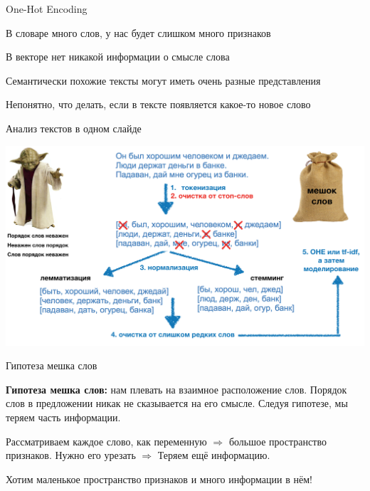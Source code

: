 \documentclass[notes,12pt, aspectratio=169]{beamer}
\newenvironment{wideitemize}{\itemize\addtolength{\itemsep}{10pt}}{\enditemize}
\begin{document}
\begin{frame}{One-Hot Encoding}
\begin{wideitemize} 
	\item  В словаре много слов, у нас будет слишком много признаков
	\item  В векторе нет никакой информации о смысле слова
	\item  Семантически похожие тексты могут иметь очень разные представления
	\item  Непонятно, что делать, если в тексте появляется какое-то новое слово
\end{wideitemize}
\end{frame} 


\begin{frame}{Анализ текстов в одном слайде}
\begin{center}
	\includegraphics[width=.95\linewidth]{classic_text.png}
\end{center}
\end{frame} 


\begin{frame}{Гипотеза мешка слов}
\begin{wideitemize} 
\item \textbf{Гипотеза мешка слов:} нам плевать на взаимное расположение слов. Порядок слов в предложении никак не сказывается на его смысле. 	{\color{red}  Следуя гипотезе, мы теряем часть информации.}
	
\item Рассматриваем каждое слово, как переменную $\Rightarrow$ большое пространство признаков. Нужно его урезать $\Rightarrow$ 	{\color{red}  Теряем ещё информацию.}

\item Хотим маленькое пространство признаков и много информации в нём!
\end{wideitemize}
\end{frame} 
\end{document}
